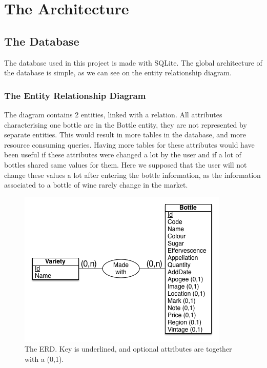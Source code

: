 

\section{The Architecture}

\subsection{The Database}

The database used in this project is made with SQLite. The global architecture of the database is simple, as we can see on the entity relationship diagram.

\subsubsection{The Entity Relationship Diagram}

The diagram contains 2 entities, linked with a relation. All attributes characterising one bottle are in the Bottle entity, they are not represented by separate entities. This would result in more tables in the database, and more resource consuming queries. Having more tables for these attributes would have been useful if these attributes were changed a lot by the user and if a lot of bottles shared same values for them. Here we supposed that the user will not change these values a lot after entering the bottle information, as the information associated to a bottle of wine rarely change in the market.

\begin{figure}[H]
\begin{center}
	\includegraphics[scale=0.7]{../ERD.png}
	\caption{The ERD. Key is underlined, and optional attributes are together with a (0,1).}
\end{center}
\end{figure}


